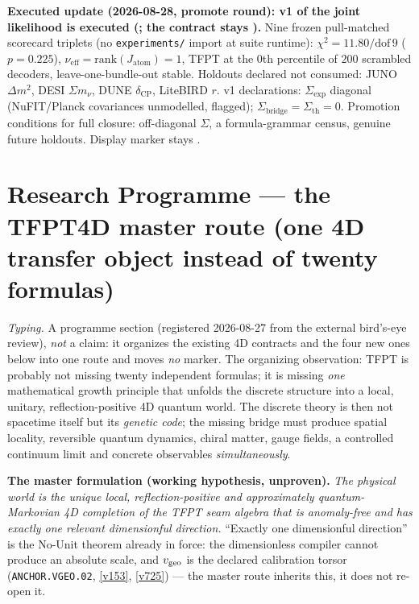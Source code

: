 \documentclass[11pt,a4paper]{article}
\begin{document}
\par\smallskip\noindent\textbf{Executed update (2026-08-28, promote round): v1 of the joint
likelihood is executed
(; the contract stays
\mO).}
Nine frozen pull-matched scorecard triplets (no \texttt{experiments/} import at suite runtime):
$\chi^2=11.80/\mathrm{dof}\,9$ ($p=0.225$), $\nu_{\mathrm{eff}}=\mathrm{rank}(J_{\mathrm{atom}})=1$,
TFPT at the $0$th percentile of $200$ scrambled decoders, leave-one-bundle-out stable.
Holdouts declared not consumed: JUNO $\Delta m^2$, DESI $\Sigma m_\nu$, DUNE $\delta_{\mathrm{CP}}$,
LiteBIRD $r$.  v1 declarations: $\Sigma_{\mathrm{exp}}$ diagonal (NuFIT/Planck covariances
unmodelled, flagged); $\Sigma_{\mathrm{bridge}}=\Sigma_{\mathrm{th}}=0$.  Promotion conditions
for full closure: off-diagonal $\Sigma$, a formula-grammar census, genuine future holdouts.
Display marker stays \mO.

\section*{Research Programme --- the TFPT4D master route (one 4D transfer object instead of twenty formulas)}
\noindent\emph{Typing.} A programme section (registered 2026-08-27 from the external bird's-eye
review), \emph{not} a claim: it organizes the existing 4D contracts and the four new ones below
into one route and moves \emph{no} marker.  The organizing observation: TFPT is probably not
missing twenty independent formulas; it is missing \emph{one} mathematical growth principle that
unfolds the discrete structure into a local, unitary, reflection-positive 4D quantum world.  The
discrete theory is then not spacetime itself but its \emph{genetic code}; the missing bridge
must produce spatial locality, reversible quantum dynamics, chiral matter, gauge fields, a
controlled continuum limit and concrete observables \emph{simultaneously}.

\par\smallskip\noindent\textbf{The master formulation (working hypothesis, unproven).}
\emph{The physical world is the unique local, reflection-positive and approximately
quantum-Markovian 4D completion of the TFPT seam algebra that is anomaly-free and has exactly
one relevant dimensionful direction.}  ``Exactly one dimensionful direction'' is the No-Unit
theorem already in force: the dimensionless compiler cannot produce an absolute scale, and
$v_{\rm geo}$ is the declared calibration torsor (\texttt{ANCHOR.VGEO.02}, \vref{v153},
\vref{v725}) --- the master route inherits this, it does not re-open it.
\end{document}
